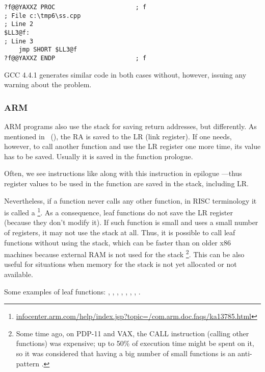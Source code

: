 \begin{lstlisting}
?f@@YAXXZ PROC						; f
; File c:\tmp6\ss.cpp
; Line 2
$LL3@f:
; Line 3
	jmp	SHORT $LL3@f
?f@@YAXXZ ENDP						; f
\end{lstlisting}

GCC 4.4.1 generates similar code in both cases without, however,  issuing any warning about the problem.

\subsubsection{ARM}

ARM programs also use the stack for saving return addresses, but differently.
As mentioned in \q{\HelloWorldSectionName}~(),
the \ac{RA} is saved to the \ac{LR} (\gls{link register}).
If one needs, however, to call another function and use the \ac{LR} register
one more time, its value has to be saved.
Usually it is saved in the function prologue.

Often, we see instructions like  along with this instruction in epilogue
---thus register values to be used in the function are saved in the stack, including \ac{LR}.

Nevertheless, if a function never calls any other function, in \ac{RISC} terminology it is called a
\footnote{\href{http://go.yurichev.com/17064}{infocenter.arm.com/help/index.jsp?topic=/com.arm.doc.faqs/ka13785.html}}. 
As a consequence, leaf functions do not save the \ac{LR} register (because they don't modify it).
If such function is small and uses a small number of registers, it may not use the stack at all.
Thus, it is possible to call leaf functions without using the stack,
which can be faster than on older x86 machines because external RAM is not used for the stack
\footnote{Some time ago, on PDP-11 and VAX, the CALL instruction (calling other functions) was expensive; up to 50\%
of execution time might be spent on it, so it was considered that having a big number of small functions is an \gls{anti-pattern} \cite[Chapter 4, Part II]{Raymond:2003:AUP:829549}.}.
This can be also useful for situations when memory for the stack is not yet allocated or not available.

Some examples of leaf functions:
, , 
, , ,
, , .

